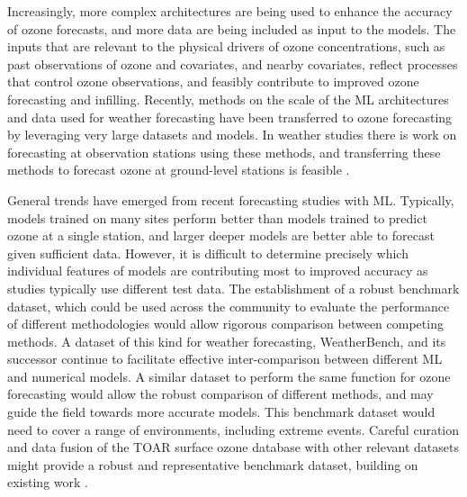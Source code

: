 \documentclass[gmd, manuscript]{copernicus}
\begin{document}
Increasingly, more complex architectures are being used to enhance the accuracy of ozone forecasts, and more data are being included as input to the models. The inputs that are relevant to the physical drivers of ozone concentrations, such as past observations of ozone and covariates, and nearby covariates, reflect processes that control ozone observations, and feasibly contribute to improved ozone forecasting and infilling. Recently, methods on the scale of the ML architectures and data used for weather forecasting \citep{bi_accurate_2023, lam_learning_2023} have been transferred to ozone forecasting by leveraging very large datasets and models. In weather studies there is work on forecasting at observation stations using these methods, and transferring these methods to forecast ozone at ground-level stations is feasible \citep{manshausen_generative_2024}. 

General trends have emerged from recent forecasting studies with ML. Typically, models trained on many sites perform better than models trained to predict ozone at a single station, and larger deeper models are better able to forecast given sufficient data. However, it is difficult to determine precisely which individual features of models are contributing most to improved accuracy as studies typically use different test data. The establishment of a robust benchmark dataset, which could be used across the community to evaluate the performance of different methodologies would allow rigorous comparison between competing methods. A dataset of this kind for weather forecasting, WeatherBench, and its successor \citep{Rasp2020, Rasp2024} continue to facilitate effective inter-comparison between different ML and numerical models. A similar dataset to perform the same function for ozone forecasting would allow the robust comparison of different methods, and may guide the field towards more accurate models. This benchmark dataset would need to cover a range of environments, including extreme events. Careful curation and data fusion of the TOAR surface ozone database with other relevant datasets might provide a robust and representative benchmark dataset, building on existing work \citep{Betancourt2021}.
\end{document}
